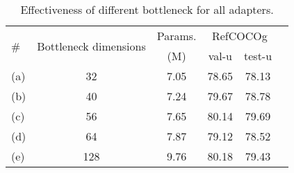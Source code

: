 \begin{table}[!t]
\centering
\renewcommand{\arraystretch}{1.5}
\caption{Effectiveness of different bottleneck for all adapters.}
\label{Table:neck}
\small
\setlength{\tabcolsep}{8pt}

\begin{tabular}{l|c|c|ccc}
\toprule
    
 \multirow{2}{*}{\#} & \multirow{2}{*}{Bottleneck dimensions} & \multicolumn{1}{c|}{Params.} & \multicolumn{2}{c}{RefCOCOg} \\

 & & (M) & val-u & test-u  \\ \midrule
(a)  &32 & 7.05 &  78.65 & 78.13  \\
(b)  &40 & 7.24 &  79.67 & 78.78  \\
\rowcolor{gray!20}
(c) & 56&7.65  & 80.14 &79.69  \\
(d) & 64& 7.87  & 79.12 & 78.52 \\
(e) & 128&  9.76 & 80.18 &79.43  \\


\bottomrule

\end{tabular}
\vspace{-2mm}

\end{table}